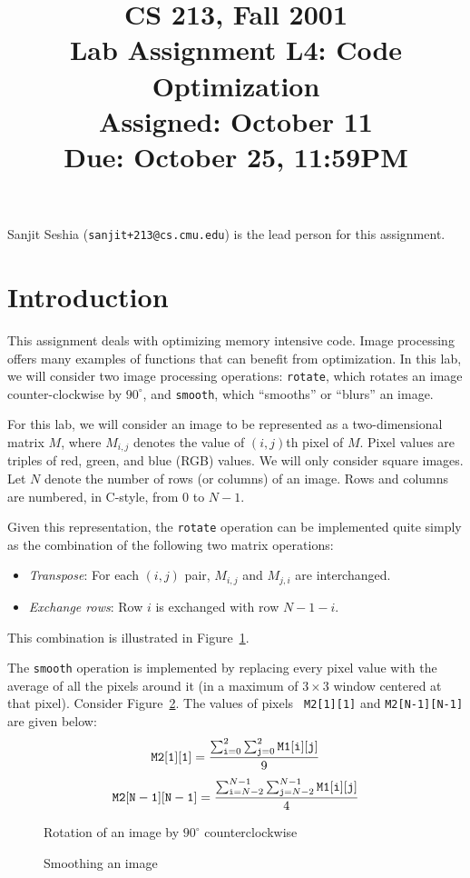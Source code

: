 \documentclass[11pt]{article}
\title{CS 213, Fall 2001\\
Lab Assignment L4: Code Optimization\\
Assigned: October 11 \\
Due: October 25, 11:59PM\\}
\author{}
\date{}
\begin{document}
\maketitle
Sanjit Seshia ({\tt sanjit+213@cs.cmu.edu}) is the lead person for
this assignment.  

\section{Introduction}
This assignment deals with optimizing memory intensive code.
Image processing offers many examples of functions that can benefit
from optimization. In this lab, we will consider two image processing
operations: {\tt rotate}, which rotates an image counter-clockwise by 
$90^\circ$, and {\tt smooth}, which ``smooths'' or ``blurs'' an
image. 

For this lab, we will consider an image to be represented as a
two-dimensional matrix $M$, where $M_{i,j}$ denotes the value of
$(i,j)$th pixel of $M$. Pixel values are triples of red, green, and
blue (RGB) values. We will only consider square images. Let $N$ denote
the number of rows (or columns) of an image. Rows and columns are
numbered, in C-style, from $0$ to $N-1$.

Given this representation, the {\tt rotate} operation can be 
implemented quite simply as the combination of the following 
two matrix operations:
\begin{itemize}
\item {\em Transpose}: For each $(i,j)$ pair, 
$M_{i,j}$ and $M_{j,i}$ are interchanged.
\item {\em Exchange rows}: Row $i$ is exchanged with row $N-1-i$.
\end{itemize}
This combination is illustrated in Figure~\ref{fig:rotate}.

The {\tt smooth} operation is implemented by replacing every pixel
value with the average of all the pixels around it (in a maximum of 
$3 \times 3$ window centered at that pixel). 
Consider Figure~\ref{fig:smooth}. The values of pixels {\tt
M2[1][1]} and {\tt M2[N-1][N-1]} are given below:
$$ {\tt M2[1][1]} = \frac{\sum_{{\tt i}=0}^{2} \sum_{{\tt j}=0}^{2}
{\tt M1[i][j]}}{9} $$
$$ {\tt M2[N-1][N-1]} = \frac{\sum_{{\tt i}=N-2}^{N-1} \sum_{{\tt j}=N-2}^{N-1}
{\tt M1[i][j]}}{4} $$

\begin{figure}[htbp]
\centerline{}
\caption{Rotation of an image by $90^\circ$ counterclockwise}
\label{fig:rotate}
\end{figure}
\begin{figure}[htbp]
\centerline{}
\caption{Smoothing an image}
\label{fig:smooth}
\end{figure}
\end{document}
